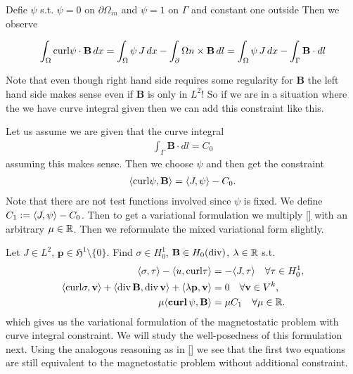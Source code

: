 \documentclass[../master_thesis.tex]{subfiles}
\begin{document}
Defie $\psi$ s.t. $\psi = 0$ on $\partial \Omega_{in}$ and $\psi = 1$ on $\Gamma$ 
and constant one outside
Then we observe 

\begin{align*}
    \int_\Omega \mathbf{\operatorname{curl}} \psi \cdot \mathbf{B} \, dx = 
    \int_\Omega \psi \, J \, dx - \int_\partial\Omega n\times \mathbf{B} \, dl
    = \int_\Omega \psi \, J \, dx - \int_\Gamma \mathbf{B}\cdot dl
\end{align*}

Note that even though right hand side requires some regularity for $\mathbf{B}$
the left hand side makes sense even if $\mathbf{B}$ is only in $L^2$!
So if we are in a situation where the we have curve integral given then 
we can add this constraint like this. 

Let us assume we are given that the curve integral 
\begin{align*}
    \int_\Gamma \mathbf{B} \cdot dl = C_0
\end{align*}
assuming this makes sense. Then we choose $\psi$ and then get 
the constraint
\begin{align*}
    \langle \mathbf{\operatorname{curl}} \psi, \mathbf{B} \rangle = \langle J, \psi \rangle - C_0.
\end{align*}
Note that there are not test functions involved since $\psi$ is fixed. 
We define $C_1 \vcentcolon=  \langle J, \psi \rangle - C_0$. Then to get a variational 
formulation we multiply \ref{} with an arbitrary $\mu \in \mathbb{R}$. Then we reformulate 
the mixed variational form slightly. 

Let $J \in L^2$, $\mathbf{p} \in \mathfrak{H}^1 \setminus \{0\}$. 
Find $\sigma \in H^1_0$, $\mathbf{B} \in H_0(\operatorname{div})$, $\lambda \in \mathbb{R}$ s.t.
\begin{align}
    \langle \sigma, \tau \rangle - \langle u, \mathbf{\curl}\tau \rangle 
    &=  -\langle J, \tau \rangle \quad \forall \tau \in H^1_0, \label{eq:first_eq_mixed_formulation_curve_integral}
    \\ \langle \mathbf{\curl}\sigma, \mathbf{v} \rangle + \langle \diver \mathbf{B}, \diver \mathbf{v} \rangle 
    + \langle \lambda \mathbf{p}, \mathbf{v} \rangle 
    &= 0 \quad \forall \mathbf{v} \in V^k, \label{eq:second_eq_mixed_formulation_curve_integral}
    \\ \mu \langle \bm{\curl} \psi, \mathbf{B} \rangle &= \mu C_1 \quad \forall \mu \in \real.
\end{align}
which gives us the variational formulation of the magnetostatic problem with curve integral 
constraint. We will study the well-posedness of this formulation next. 
Using the analogous reasoning as in \ref{} we see that the first two equations are still equivalent 
to the magnetostatic problem without additional constraint.
\end{document}
